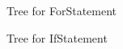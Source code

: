 \documentclass[a4paper, 12pt]{article}
\begin{document}
\begin{figure}[h]
    \centering
    \caption{Tree for ForStatement}
\end{figure}

\begin{figure}[h]
    \centering
    \caption{Tree for IfStatement}
\end{figure}
\end{document}
